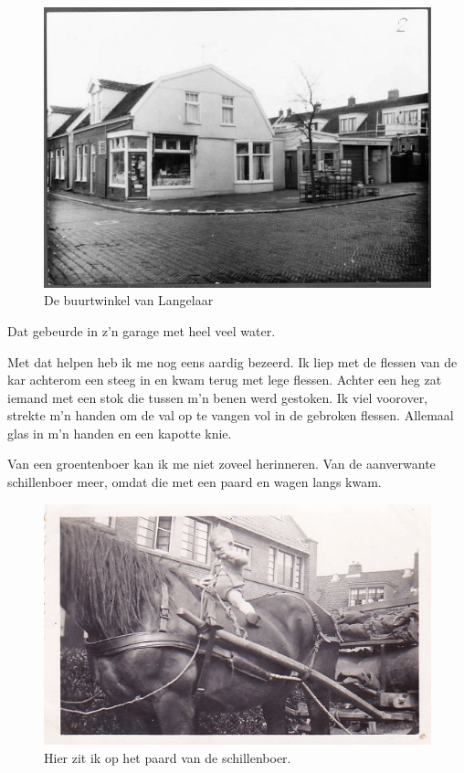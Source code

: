 \documentclass[10pt,twoside, openright]{memoir}
\begin{document}
\begin{figure}
\includegraphics[width=\textwidth]{img/64Rosmolenstraat-Langelaar-1966}
\caption*{\footnotesize De buurtwinkel van Langelaar}
\end{figure}

Dat gebeurde in z’n garage met heel veel water. 

Met dat helpen heb ik me nog eens aardig bezeerd. Ik liep met de flessen van de kar achterom een steeg in en kwam terug met lege flessen. Achter een heg zat iemand met een stok die tussen m’n benen werd gestoken. Ik viel voorover, strekte m'n handen om de val op te vangen vol in de gebroken flessen. Allemaal glas in m'n handen en een kapotte knie.

Van een groentenboer kan ik me niet zoveel herinneren. Van de aanverwante schillenboer meer, omdat die met een paard en wagen langs kwam. 

\begin{figure}
\includegraphics[width=\textwidth]{img/63schillenboer}
\caption*{\footnotesize Hier zit ik op het paard van de schillenboer.}
\end{figure}
\end{document}
